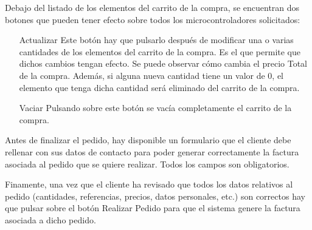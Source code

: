 Debajo del listado de los elementos del carrito de la compra, se encuentran dos botones que pueden tener efecto sobre
todos los microcontroladores solicitados:
\begin{itemize}
	\item[Actualizar] Este botón hay que pulsarlo después de modificar una o varias cantidades de los elementos del 
	carrito de la compra. Es el que permite que dichos cambios tengan efecto. Se puede observar cómo cambia el precio
	Total de la compra. Además, si alguna nueva cantidad tiene un valor de 0, el elemento que tenga dicha cantidad 			
  será eliminado del carrito de la compra.
	
	\item[Vaciar] Pulsando sobre este botón se vacía completamente el carrito de la compra.
\end{itemize}

Antes de finalizar el pedido, hay disponible un formulario que el cliente debe rellenar con sus datos de contacto 
para poder generar correctamente la factura asociada al pedido que se quiere realizar. Todos los campos son obligatorios.

Finamente, una vez que el cliente ha revisado que todos los datos relativos al pedido (cantidades, referencias, precios, 
datos personales, etc.) son correctos hay que pulsar sobre el botón Realizar Pedido para que el sistema genere la 
factura asociada a dicho pedido.